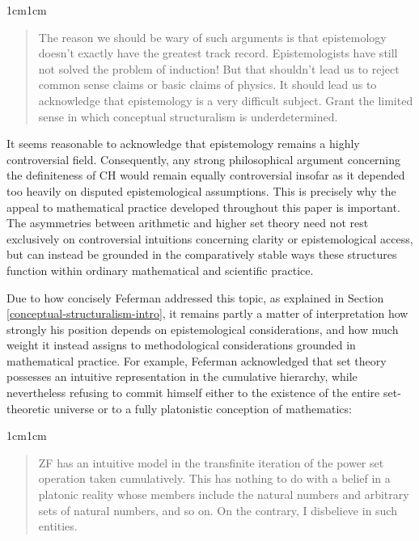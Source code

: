 \documentclass[11pt,a4paper]{article}
\theoremstyle{plain}
\begin{document}
\begin{adjustwidth}{1cm}{1cm}
\begin{quote}
\small
The reason we should be wary of such arguments is that epistemology doesn't exactly have the greatest track record. Epistemologists have still not solved the problem of induction! But that shouldn't lead us to reject common sense claims or basic claims of physics. It should lead us to acknowledge that epistemology is a very difficult subject. Grant the limited sense in which conceptual structuralism is underdetermined. \parencite[506]{Koellner2016}
\end{quote}
\end{adjustwidth}

It seems reasonable to acknowledge that epistemology remains a highly controversial field. Consequently, any strong philosophical argument concerning the definiteness of CH would remain equally controversial insofar as it depended too heavily on disputed epistemological assumptions. This is precisely why the appeal to mathematical practice developed throughout this paper is important. The asymmetries between arithmetic and higher set theory need not rest exclusively on controversial intuitions concerning clarity or epistemological access, but can instead be grounded in the comparatively stable ways these structures function within ordinary mathematical and scientific practice.

Due to how concisely Feferman addressed this topic, as explained in Section \ref{conceptual-structuralism-intro}, it remains partly a matter of interpretation how strongly his position depends on epistemological considerations, and how much weight it instead assigns to methodological considerations grounded in mathematical practice. For example, Feferman acknowledged that set theory possesses an intuitive representation in the cumulative hierarchy, while nevertheless refusing to commit himself either to the existence of the entire set-theoretic universe or to a fully platonistic conception of mathematics:

\begin{adjustwidth}{1cm}{1cm}
\begin{quote}
\small
ZF has an intuitive model in the transfinite iteration of the power set operation taken cumulatively. This has nothing to do with a belief in a platonic reality whose members include the natural numbers and arbitrary sets of natural numbers, and so on. On the contrary, I disbelieve in such entities. \parencite[72]{Feferman2000rationale}
\end{quote}
\end{adjustwidth}
\end{document}
